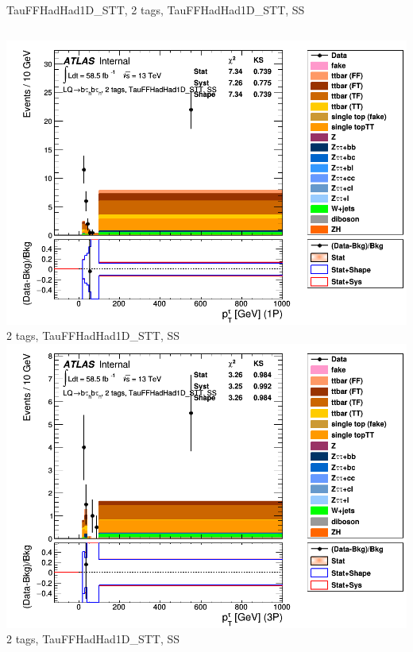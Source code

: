 \begin{frame}{TauFFHadHad1D\_STT, 2 tags, TauFFHadHad1D\_STT, SS}
  \begin{columns}[c]
    \centering\includegraphics[width=\textwidth]{C_2tag2pjet_0ptv_SS_TauPt1P}\\
    2 tags, TauFFHadHad1D\_STT, SS
    \centering\includegraphics[width=\textwidth]{C_2tag2pjet_0ptv_SS_TauPt3P}\\
    2 tags, TauFFHadHad1D\_STT, SS
  \end{columns}
  \begin{columns}[c]

\end{columns}
\end{frame}
